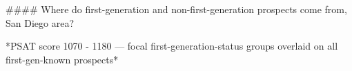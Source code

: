 #### Where do first-generation and non-first-generation prospects come from, San Diego area?

*PSAT score 1070 - 1180 — focal first-generation-status groups overlaid on all first-gen-known prospects*

